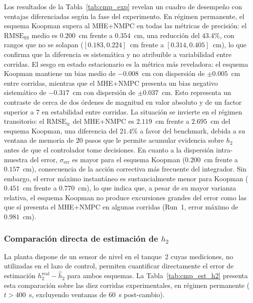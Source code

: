 \documentclass[12pt,letterpaper]{article}
\begin{document}
Los resultados de la Tabla~\ref{tab:cmp_exp} revelan un 
cuadro de desempeño con ventajas diferenciadas según la fase 
del experimento. En régimen permanente, el esquema Koopman 
supera al MHE+NMPC en todas las métricas de precisión: el 
$\mathrm{RMSE}_{\mathrm{SS}}$ medio es $0.200$~cm frente a 
$0.354$~cm, una reducción del $43.4\%$, con rangos que no 
se solapan ($[0.183, 0.224]$~cm frente a $[0.314, 0.405]$~cm), 
lo que confirma que la diferencia es sistemática y no 
atribuible a variabilidad entre corridas. El sesgo en estado 
estacionario es la métrica más reveladora: el esquema Koopman
mantiene un bias medio de $-0.008$~cm con dispersión de
$\pm 0.005$~cm entre corridas, mientras que el MHE+NMPC
presenta un bias negativo sistemático de $-0.317$~cm con
dispersión de $\pm 0.037$~cm. Esto representa un contraste de
cerca de dos órdenes de magnitud en valor absoluto y de un factor
superior a $7$ en estabilidad entre corridas. La situación se invierte
en el régimen transitorio: el $\mathrm{RMSE}_{\mathrm{tr}}$ 
del MHE+NMPC es $2.119$~cm frente a $2.695$~cm del esquema 
Koopman, una diferencia del $21.4\%$ a favor del benchmark, 
debida a su ventana de memoria de $20$ pasos que le permite 
acumular evidencia sobre $h_2$ antes de que el controlador 
tome decisiones. En cuanto a la dispersión intra-muestra del 
error, $\sigma_{\mathrm{err}}$ es mayor para el esquema
Koopman ($0.200$~cm frente a $0.157$~cm), consecuencia de la
acción correctiva más frecuente del integrador. Sin embargo,
el error máximo instantáneo es sustancialmente menor para
Koopman ($0.451$~cm frente a $0.770$~cm), lo que indica que,
a pesar de su mayor varianza relativa, el esquema Koopman no
produce excursiones grandes del error como las que sí
presenta el MHE+NMPC en algunas corridas (Run~1, error
máximo de $0.981$~cm).

\subsubsection{Comparación directa de estimación de $h_2$}
\label{sec:est_h2_exp}

La planta dispone de un sensor de nivel en el tanque~2 cuyas
mediciones, no utilizadas en el lazo de control, permiten
cuantificar directamente el error de estimación
$h_2^{\mathrm{real}} - \hat{h}_2$ para ambos esquemas.
La Tabla~\ref{tab:cmp_est_h2} presenta esta comparación
sobre las diez corridas experimentales, en régimen permanente
($t > 400$~s, excluyendo ventanas de $60$~s post-cambio).
\end{document}
